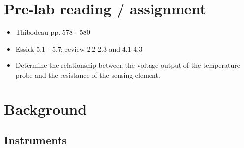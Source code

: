 \documentclass[12pt,oneside]{article}
\begin{document}
\section{Pre-lab reading / assignment}
\begin{itemize}
\item Thibodeau pp. 578 - 580
\item Essick 5.1 - 5.7; review 2.2-2.3 and 4.1-4.3
\item Determine the relationship between the voltage output of the temperature probe and the resistance of the sensing element.
\end{itemize}

\section{Background}
\subsection{Instruments}
\end{document}
